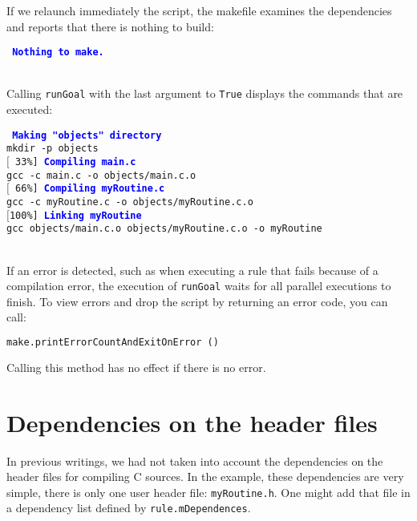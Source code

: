 \documentclass[a4paper,11pt]{extarticle}
\begin{document}
If we relaunch immediately the script, the makefile examines the dependencies and reports that there is nothing to build:

\begin{mdframed}[hidealllines=true,backgroundcolor=lightgray!20]
\tt\footnotesize
\textcolor{blue}{\bf Nothing to make.}
\end{mdframed}



~\\Calling \texttt{runGoal} with the last argument to \texttt{True} displays the commands that are executed:

\begin{mdframed}[hidealllines=true,backgroundcolor=lightgray!20]
\tt\footnotesize
\textcolor{blue}{\bf Making "objects" directory}\\
mkdir -p objects\\
$[$~33\%]~\textcolor{blue}{\bf Compiling main.c}\\
gcc -c main.c -o objects/main.c.o\\
$[$~66\%]~\textcolor{blue}{\bf Compiling myRoutine.c}\\
gcc -c myRoutine.c -o objects/myRoutine.c.o\\
$[$100\%]~\textcolor{blue}{\bf Linking myRoutine}\\
gcc objects/main.c.o objects/myRoutine.c.o -o myRoutine
\end{mdframed}

~\\If an error is detected, such as when executing a rule that fails because of a compilation error, the execution of \texttt{runGoal}  waits for all parallel executions to finish. To view errors and drop the script by returning an error code, you can call:
\begin{lstlisting}[language=py]
make.printErrorCountAndExitOnError ()
\end{lstlisting}
Calling this method has no effect if there is no error.

\section{Dependencies on the header files}

In previous writings, we had not taken into account the dependencies on the header files for compiling C sources. In the example, these dependencies are very simple, there is only one user header file: \texttt{myRoutine.h}. One might add that file in a dependency list defined by \texttt{rule.mDependences}.
\end{document}

